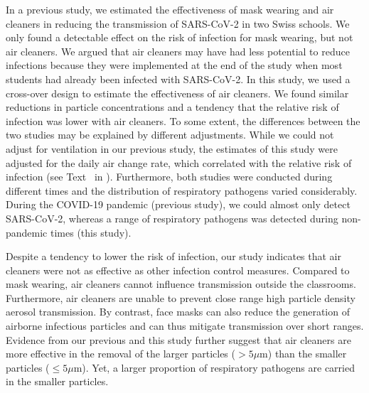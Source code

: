 \documentclass[fleqn,11pt]{wlscirep}
\begin{document}

In a previous study\cite{Banholzer2023PLoSMed}, we estimated the effectiveness of mask wearing and air cleaners in reducing the transmission of SARS-CoV-2 in two Swiss schools. We only found a detectable effect on the risk of infection for mask wearing, but not air cleaners. We argued that air cleaners may have had less potential to reduce infections because they were implemented at the end of the study when most students had already been infected with SARS-CoV-2. In this study, we used a cross-over design to estimate the effectiveness of air cleaners. We found similar reductions in particle concentrations and a tendency that the relative risk of infection was lower with air cleaners. To some extent, the differences between the two studies may be explained by different adjustments. While we could not adjust for ventilation in our previous study, the estimates of this study were adjusted for the daily air change rate, which correlated with the relative risk of infection (see Text~ in \supp). Furthermore, both studies were conducted during different times and the distribution of respiratory pathogens varied considerably. During the COVID-19 pandemic (previous study), we could almost only detect SARS-CoV-2, whereas a range of respiratory pathogens was detected during non-pandemic times (this study). 


Despite a tendency to lower the risk of infection, our study indicates that air cleaners were not as effective as other infection control measures. Compared to \eg mask wearing, air cleaners cannot influence transmission outside the classrooms. Furthermore, air cleaners are unable to prevent close range high particle density aerosol transmission. By contrast, face masks can also reduce the generation of airborne infectious particles and can thus mitigate transmission over short ranges. Evidence from our previous\cite{Banholzer2023PLoSMed} and this study further suggest that air cleaners are more effective in the removal of the larger particles ($>5\mu$m) than the smaller particles ($\leq5\mu$m). Yet, a larger proportion of respiratory pathogens are carried in the smaller particles\cite{Fennelly2020}. 

\end{document}
